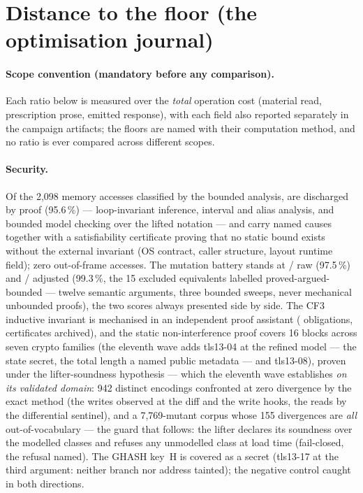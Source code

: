 \documentclass[10pt,a4paper]{article}
\begin{document}







\section{Distance to the floor (the optimisation journal)}\label{sec:floor}
\paragraph{Scope convention (mandatory before any comparison).}
Each ratio below is measured over the \emph{total} operation cost
(material read, prescription prose, emitted response), with each field
also reported separately in the campaign artifacts; the floors are
named with their computation method, and no ratio is ever compared
across different scopes.

\paragraph{Security.} Of the 2{,}098 memory accesses classified by the
bounded analysis, \sureteDecharges{} are discharged by proof (95.6\,\%)
--- loop-invariant inference, interval and alias analysis, and bounded
model checking over the lifted notation --- and \sureteNOMMES{} carry
named causes together with a satisfiability certificate proving that no
static bound exists without the external invariant (OS contract, caller
structure, layout runtime field); zero out-of-frame accesses. The
mutation battery stands at \mutationBrutNum/\mutationDenomBrut{} raw
(97.5\,\%) and \mutationAjusteNum/\mutationDenomAjuste{} adjusted
(99.3\,\%, the 15 excluded equivalents labelled
proved-argued-bounded --- twelve semantic arguments, three bounded
sweeps, never mechanical unbounded proofs),
the two scores always presented side by side. The CF3 inductive
invariant is mechanised in an independent proof assistant
(\cfTroisObligations{} obligations, certificates archived), and the
static non-interference proof covers 16 blocks across seven crypto
families (the eleventh wave adds tls13-04 at the refined model ---
the state secret, the total length a named public metadata --- and
tls13-08), proven under the lifter-soundness hypothesis --- which the
eleventh wave establishes \emph{on its validated domain}: 942 distinct
encodings confronted at zero divergence by the exact method (the
writes observed at the diff and the write hooks, the reads by the
differential sentinel), and a 7{,}769-mutant corpus whose 155
divergences are \emph{all} out-of-vocabulary --- the guard that
follows: the lifter declares its soundness over the modelled classes
and refuses any unmodelled class at load time (fail-closed, the
refusal named). The GHASH key~H is covered as a secret (tls13-17 at
the third argument: neither branch nor address tainted); the
negative control caught in both directions.
\end{document}
